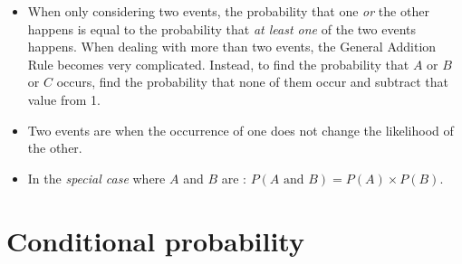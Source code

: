 \begin{itemize}
\item When only considering two events, the probability that one \emph{or} the other happens is equal to the probability that \emph{at least one} of the two events happens.  When dealing with more than two events, the General Addition Rule becomes very complicated.  Instead, to find the probability that $A$ or $B$ or $C$ occurs, find the probability that none of them occur and subtract that value from 1.  

\item Two events are  when the occurrence of one does not change the likelihood of the other.

\item In the \emph{special case} where $A$ and $B$ are :
$P(A \text{ and } B) = P(A)\times P(B)$.

\end{itemize}

{}



\section[Conditional probability]{Conditional probability }
\label{conditionalProbabilitySection}

